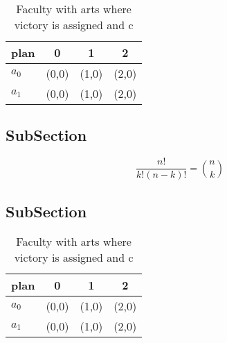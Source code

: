\documentclass[a4paper]{article}
\begin{document}
\begin{table}
\begin{adjustbox}{width=0.6\columnwidth}
\begin{tabular}{|l|l|l|l|}
\hline
\textbf{plan} & \multicolumn{1}{c|}{\textbf{0}} & \multicolumn{1}{c|}{\textbf{1}} & \multicolumn{1}{c|}{\textbf{2}} \\ \hline
\textbf{$a_0$}  & (0,0) & (1,0) & (2,0) \\ \hline
\textbf{$a_1$}  & (0,0) & (1,0) & (2,0) \\ \hline
\end{tabular}
\end{adjustbox}
\caption{Faculty with arts where victory is assigned and c
}
\end{table}

\subsection{SubSection}

\[ \frac{n!}{k!(n-k)!} = \binom{n}{k} \]

\subsection{SubSection}

\begin{table}
\begin{adjustbox}{width=0.6\columnwidth}
\begin{tabular}{|l|l|l|l|}
\hline
\textbf{plan} & \multicolumn{1}{c|}{\textbf{0}} & \multicolumn{1}{c|}{\textbf{1}} & \multicolumn{1}{c|}{\textbf{2}} \\ \hline
\textbf{$a_0$}  & (0,0) & (1,0) & (2,0) \\ \hline
\textbf{$a_1$}  & (0,0) & (1,0) & (2,0) \\ \hline
\end{tabular}
\end{adjustbox}
\caption{Faculty with arts where victory is assigned and c
}
\end{table}
\end{document}
